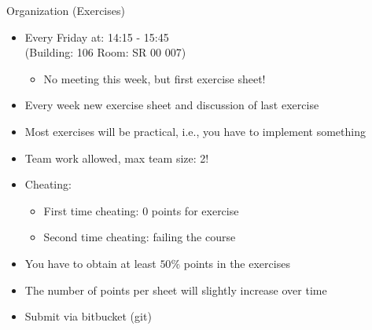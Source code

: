 \begin{frame}[c]{Organization (Exercises)}

\begin{itemize}
  \item Every Friday at: 14:15 - 15:45\\ (Building: 106 Room: SR 00 007)
  \begin{itemize}
    \item No meeting this week, but first exercise sheet!
  \end{itemize}
  \item Every week new exercise sheet and discussion of last exercise
  \item Most exercises will be practical, i.e., you have to implement something
  \item Team work allowed, max team size: 2! 
  \item Cheating:
  \begin{itemize}
    \item First time cheating: $0$ points for exercise
    \item Second time cheating: failing the course
  \end{itemize}
  \item You have to obtain at least $50\%$ points in the exercises  
  \item The number of points per sheet will slightly increase over time
  \item Submit via bitbucket (git)
\end{itemize}

\end{frame}
% 
% 
